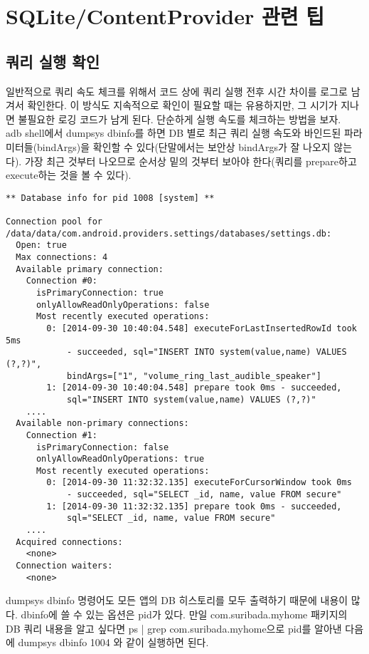 \section{SQLite/ContentProvider 관련 팁}
\subsection{쿼리 실행 확인}
일반적으로 쿼리 속도 체크를 위해서 코드 상에 쿼리 실행 전후 시간 차이를 로그로 남겨서 확인한다. 이 방식도 지속적으로 확인이 필요할 때는 유용하지만, 그 시기가 지나면 불필요한 로깅 코드가 남게 된다.
단순하게 실행 속도를 체크하는 방법을 보자.\\

adb shell에서 dumpsys dbinfo를 하면 DB 별로 최근 쿼리 실행 속도와 바인드된 파라미터들(bindArgs)을 확인할 수 있다(단말에서는 보안상 bindArgs가 잘 나오지 않는다).
가장 최근 것부터 나오므로 순서상 밑의 것부터 보아야 한다(쿼리를 prepare하고 execute하는 것을 볼 수 있다).

\begin{lstlisting}[frame=single] 
** Database info for pid 1008 [system] **

Connection pool for /data/data/com.android.providers.settings/databases/settings.db:
  Open: true
  Max connections: 4
  Available primary connection:
    Connection #0:
      isPrimaryConnection: true
      onlyAllowReadOnlyOperations: false
      Most recently executed operations:
        0: [2014-09-30 10:40:04.548] executeForLastInsertedRowId took 5ms 
        	- succeeded, sql="INSERT INTO system(value,name) VALUES (?,?)", 
			bindArgs=["1", "volume_ring_last_audible_speaker"]
        1: [2014-09-30 10:40:04.548] prepare took 0ms - succeeded, 
        	sql="INSERT INTO system(value,name) VALUES (?,?)"
	....
  Available non-primary connections:
    Connection #1:
      isPrimaryConnection: false
      onlyAllowReadOnlyOperations: true
      Most recently executed operations:
        0: [2014-09-30 11:32:32.135] executeForCursorWindow took 0ms 
        	- succeeded, sql="SELECT _id, name, value FROM secure"
        1: [2014-09-30 11:32:32.135] prepare took 0ms - succeeded, 
        	sql="SELECT _id, name, value FROM secure"
	....
  Acquired connections:
    <none>
  Connection waiters:
    <none>
\end{lstlisting}
dumpsys dbinfo 명령어도 모든 앱의 DB 히스토리를 모두 출력하기 때문에 내용이 많다. dbinfo에 쓸 수 있는 옵션은 pid가 있다. 만일 com.suribada.myhome 패키지의 DB 쿼리 내용을 알고 싶다면 ps | grep com.suribada.myhome으로 pid를 알아낸 다음에 dumpsys dbinfo 1004 와 같이 실행하면 된다.\\

